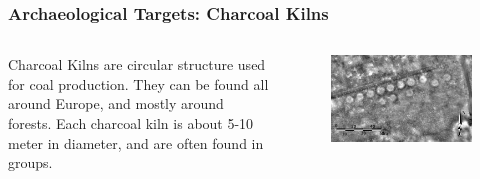 \documentclass[aspectratio=169]{beamer}
\begin{document}
\begin{frame}
	\frametitle{Archaeological Targets: Charcoal Kilns}
	\begin{columns}[T] %
		\begin{column}{.48\textwidth}
			Charcoal Kilns are circular structure used for coal production. They can be found all around Europe, and mostly around forests. Each charcoal kiln is about 5-10 meter in diameter, and are often found in groups.
		\end{column}%
		\hfill%
		\begin{column}{.48\textwidth}

			\begin{figure}
				\centering
				\includegraphics[width=\textwidth]{cKilnsEx}
				\label{}
			\end{figure}
		\end{column}%
	\end{columns}


\end{frame}
\end{document}
